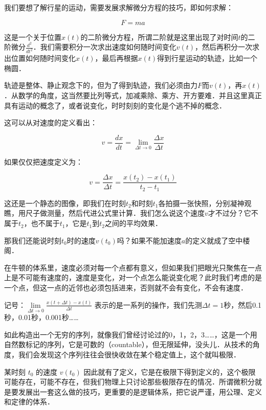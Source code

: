我们要想了解行星的运动，需要发展求解微分方程的技巧，即如何求解：

\begin{equation}
F=ma
\end{equation}


这是一个关于位置$x(t)$的二阶微分方程，所谓二阶就是这里出现了对时间$t$的二阶微分$\frac{d^2 }{ dt^2 }$．我们需要积分一次求出速度如何随时间变化$v(t)$，然后再积分一次求出位置如何随时间变化$x(t)$，最后再根据$x(t)$得到行星运动的轨迹，比如一个椭圆．

轨迹是整体、静止观念下的，但为了得到轨迹，我们必须由力$F$而$v(t)$，再$x(t)$．从数学的角度，这当然要比列等式，加减乘除、乘方、开方要难．并且这里真正具有运动的概念了，或者说变化，时时刻刻的变化是个逃不掉的概念．

这可以从对速度的定义看出：

\begin{equation}
v = \frac{d x }{d t} = \lim\limits_{\Delta t \to 0} \frac{\Delta x}{\Delta t}
\end{equation}

如果仅仅把速度定义为：

\begin{equation}
v = \frac{\Delta x}{\Delta t} = \frac{ x(t_2) - x(t_1) }{ t_2 - t_1 }
\end{equation}

这还是一个静态的图像，即我们在时刻$t_2$和时刻$t_1$各拍摄一张快照，分别凝神观瞧，用尺子做测量，然后代进公式里计算．我们怎么说这个速度$v$才不过分？它不属于$t_2$，也不属于$t_1$，它是$t_1$到$t_2$之间的平均效果．

那我们还能说时刻$t_0$时的速度$v(t_0)$吗？如果不能加速度$a$的定义就成了空中楼阁．

在牛顿的体系里，速度必须对每一个点都有意义，但如果我们把眼光只聚焦在一点上是不可能有速度的，速度是变化，对一个点怎么能说变化呢？此时我们考虑的是一个点，但这一点的近邻也必须包括进来，否则就不会有变化，不会有速度．

记号：$\lim\limits_{\Delta t \to 0} \frac{ x(t + \Delta t) - x(t) }{\Delta t}$ 表示的是一系列的操作，我们先测$\Delta t = 1$秒，然后0.1秒，0.01秒，0.001秒……

如此构造出一个无穷的序列，就像我们曾经讨论过的0，1，2，3……，这是一个用自然数标记的序列，它是可数的（countable），但无限延伸，没头儿．从技术的角度，我们会发现这个序列往往会很快收敛在某个稳定值上，这个就叫极限．


某时刻 $t_0$ 的速度 $v(t_0)$ 因此就有了定义，它是在极限下得到定义的，这个极限可能存在，可能不存在，但我们物理上只讨论那些极限存在的情况．所谓微积分就是要发展出一套这么做的技巧，更重要的是逻辑体系，把它说严谨，用公理、定义和定律的体系．

